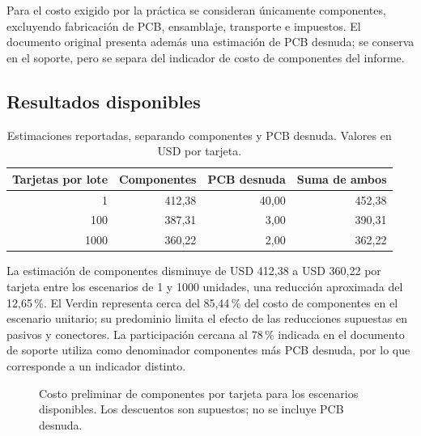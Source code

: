 \documentclass[11pt,letterpaper]{article}
\begin{document}
Para el costo exigido por la práctica se consideran únicamente componentes, excluyendo fabricación de PCB, ensamblaje, transporte e impuestos. El documento original presenta además una estimación de PCB desnuda; se conserva en el soporte, pero se separa del indicador de costo de componentes del informe.

\subsection{Resultados disponibles}
\begin{table}[htbp]
\centering\small
\caption{Estimaciones reportadas, separando componentes y PCB desnuda. Valores en USD por tarjeta.}
\label{tab:costosbom}
\begin{tabular}{rrrr}
\toprule Tarjetas por lote & Componentes & PCB desnuda & Suma de ambos \\
\midrule
1 & 412,38 & 40,00 & 452,38 \\
100 & 387,31 & 3,00 & 390,31 \\
1000 & 360,22 & 2,00 & 362,22 \\
\bottomrule
\end{tabular}
\end{table}

La estimación de componentes disminuye de USD 412,38 a USD 360,22 por tarjeta entre los escenarios de 1 y 1000 unidades, una reducción aproximada del 12,65\,\%. El Verdin representa cerca del 85,44\,\% del costo de componentes en el escenario unitario; su predominio limita el efecto de las reducciones supuestas en pasivos y conectores. La participación cercana al 78\,\% indicada en el documento de soporte utiliza como denominador componentes más PCB desnuda, por lo que corresponde a un indicador distinto.

\begin{figure}[htbp]
\centering
{}
\caption{Costo preliminar de componentes por tarjeta para los escenarios disponibles. Los descuentos son supuestos; no se incluye PCB desnuda.}
\label{fig:costosbom}
\end{figure}
\end{document}
